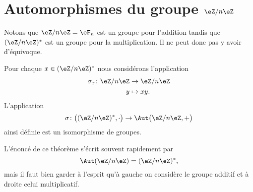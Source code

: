\section{Automorphismes du groupe \texorpdfstring{$ \eZ/n\eZ$}{Z/nZ}}

Notons que \( \eZ/n\eZ=\eF_n\) est un groupe pour l'addition tandis que \( (\eZ/n\eZ)^*\) est un groupe pour la multiplication. Il ne peut donc pas y avoir d'équivoque.

\begin{theorem}   \label{ThoozyeSn}
	Pour chaque \( x\in (\eZ/n\eZ)^*\) nous considérons l'application
	\begin{equation}
		\begin{aligned}
			\sigma_x\colon \eZ/n\eZ & \to \eZ/n\eZ \\
			y                       & \mapsto xy.
		\end{aligned}
	\end{equation}
	L'application
	\begin{equation}
		\sigma\colon \big( (\eZ/n\eZ)^*,\cdot\big)\to \Aut\big( \eZ/n\eZ,+ \big)
	\end{equation}
	ainsi définie est un isomorphisme de groupes.
\end{theorem}
L'énoncé de ce théorème s'écrit souvent rapidement par
\begin{equation}
	\Aut(\eZ/n\eZ)=(\eZ/n\eZ)^*,
\end{equation}
mais il faut bien garder à l'esprit qu'à gauche on considère le groupe additif et à droite celui multiplicatif.

